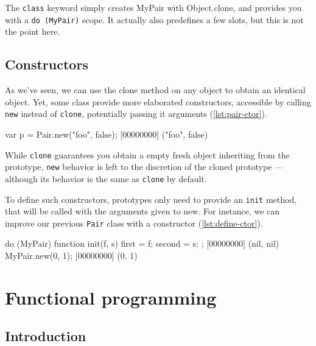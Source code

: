\documentclass[openright,twoside,12pt]{report}
\begin{document}
The \texttt{class} keyword simply creates MyPair with Object.clone,
and provides you with a \lstinline|do (MyPair)| scope. It actually also
predefines a few slots, but this is not the point here.

\section{Constructors}

As we've seen, we can use the clone method on any object to obtain an
identical object. Yet, some class provide more elaborated
constructors, accessible by calling \texttt{new} instead of
\texttt{clone}, potentially passing it arguments (\autoref{lst:pair-ctor}).

\begin{urbiscript}[caption=Calling constructors with \texttt{new},
label=lst:pair-ctor]
var p = Pair.new("foo", false);
[00000000] ("foo", false)
\end{urbiscript}

While \texttt{clone} guarantees you obtain a empty fresh object
inheriting from the prototype, \texttt{new} behavior is left to the
discretion of the cloned prototype --- although its behavior is the
same as \texttt{clone} by default.

To define such constructors, prototypes only need to provide an
\texttt{init} method, that will be called with the arguments given to
new. For instance, we can improve our previous \texttt{Pair} class
with a constructor (\autoref{lst:define-ctor}).

\begin{urbiscript}[caption=Defining constructors,
  label=lst:define-ctor, name=my-pair]
do (MyPair)
{
  function init(f, s)
  {
    first = f;
    second = s;
  }
};
[00000000] (nil, nil)
MyPair.new(0, 1);
[00000000] (0, 1)
\end{urbiscript}


\chapter{Functional programming}
\label{section:functional}

\section{Introduction}
\end{document}
